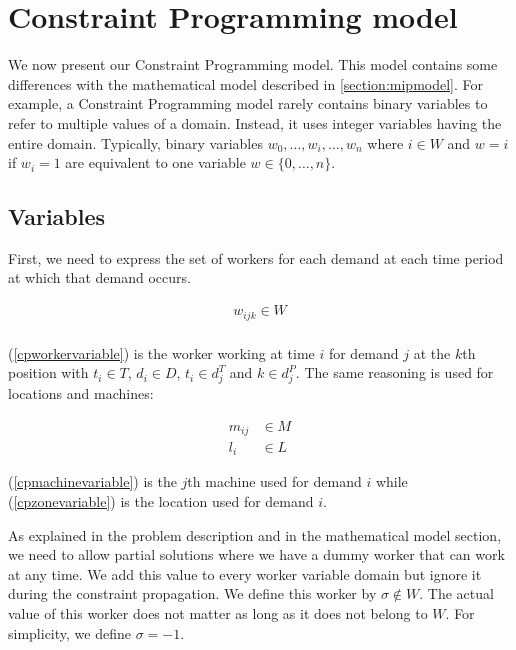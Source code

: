 \documentclass[../../thesis.tex]{subfiles}
\begin{document}
\section{Constraint Programming model}
\label{section:cpmodel}

We now present our Constraint Programming model. This model contains some differences
with the mathematical model described in \autoref{section:mipmodel}.
For example, a Constraint Programming model rarely contains binary variables to refer to multiple values 
of a domain. Instead, it uses integer variables having the entire domain. 
Typically, binary variables $w_0, \dots, w_i, \dots, w_n$ where $i \in W$ and $w = i$ if $w_i = 1$ are equivalent to 
one variable $w \in \{0, \dots, n\}$.



\subsection{Variables}

First, we need to express the set of workers for each demand at each time period at which that demand occurs.

\begin{equation}
\begin{split}
    w_{ijk} \in W \label{cpworkervariable} \\
\end{split}
\end{equation}

(\ref{cpworkervariable}) is the worker working at time $i$ for demand $j$ at the $k$th position 
with $t_i \in T$, $d_i \in D$, $t_i \in d_j^T$ and $k \in d^P_j$. The same reasoning is used for locations and machines:

\begin{align}
    m_{ij} &\in M \label{cpmachinevariable} \\ 
    l_i &\in L \label{cpzonevariable} 
\end{align}

(\ref{cpmachinevariable}) is the $j$th machine used for demand $i$ while (\ref{cpzonevariable}) is the location used for demand $i$.



As explained in the problem description and in the mathematical model section,
we need to allow partial solutions where we have a dummy worker that can work at any time.
We add this value to every worker variable domain but ignore it during the constraint propagation. We define 
this worker by $\sigma \notin W$. The actual value of this worker does not matter as long as it does not belong to $W$. For simplicity, we define $\sigma = -1$.
\end{document}
